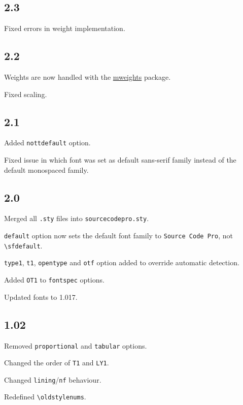 \documentclass[10pt,a4paper,english]{article}
\begin{document}
\begin{multicols}{2}
\subsection*{2.3}
\begin{itemize*}
	\item Fixed errors in weight implementation.
\end{itemize*}

\subsection*{2.2}
\begin{itemize*}
	\item Weights are now handled with the \href{http://www.ctan.org/pkg/mweights}{mweights} package.
	\item Fixed scaling.
\end{itemize*}

\subsection*{2.1}
\begin{itemize*}
	\item Added \texttt{nottdefault} option.
	\item Fixed issue in which font was set as default sans-serif family instead of the default monospaced family.
\end{itemize*}

\subsection*{2.0}
\begin{itemize*}
	\item Merged all \texttt{.sty} files into \texttt{sourcecodepro.sty}.
	\item \texttt{default} option now sets the default font family to \texttt{Source Code Pro}, not \texttt{\textbackslash sfdefault}.
	\item \texttt{type1}, \texttt{t1}, \texttt{opentype} and \texttt{otf} option added to override automatic detection.
	\item Added \texttt{OT1} to \texttt{fontspec} options.
	\item Updated fonts to 1.017.
\end{itemize*}

\subsection*{1.02}
\begin{itemize*}
	\item Removed \texttt{proportional} and \texttt{tabular} options.
	\item Changed the order of \texttt{T1} and \texttt{LY1}.
	\item Changed \texttt{lining}/\texttt{nf} behaviour.
	\item Redefined \texttt{\textbackslash oldstylenums}.
\end{itemize*}


\end{multicols}
\end{document}
